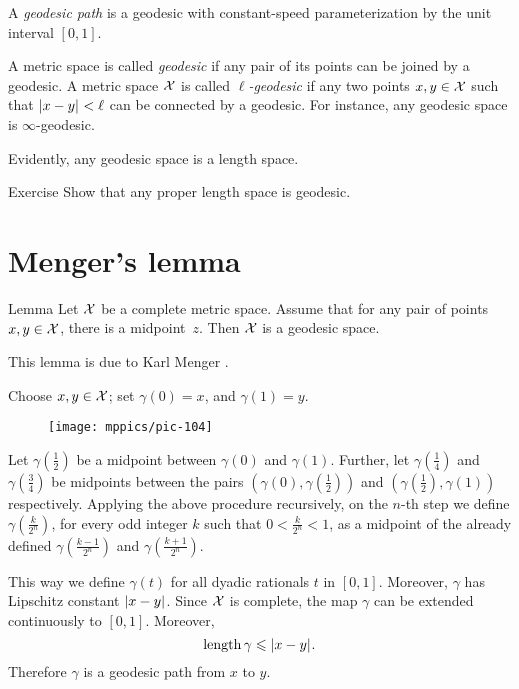 A \emph{geodesic path} is a geodesic with constant-speed parameterization by the unit interval $[0,1]$.

A metric space is called \emph{geodesic} if any pair of its points can be joined by a geodesic.
A metric space $\mathcal{X}$ is called {}\emph{$\ell$-geodesic}
if any two points $x,y\in\mathcal{X}$ such that $|{x}-{y}|_{}^{{}}<\ell$ can be connected by a geodesic.
For instance, any geodesic space is $\infty$-geodesic.

Evidently, any geodesic space is a length space.

\begin{thm}{Exercise}\label{ex:compact-length}
Show that any proper length space is geodesic.
\end{thm}

\section{Menger's lemma}

\begin{thm}{Lemma}\label{lem:mid>geod}
Let $\mathcal{X}$ be a complete metric space.
Assume that for any pair of points $x,y\in \mathcal{X}$, 
there is a midpoint~$z$.
Then $\mathcal{X}$ is a geodesic space.

\end{thm}

This lemma is due to Karl Menger \cite[Section 6]{menger}.


Choose $x,y\in \mathcal{X}$;
set $\gamma(0)=x$, and $\gamma(1)=y$.

\begin{figure}[ht!]
\vskip-0mm
\centering
\texttt{[image: mppics/pic-104]}
\end{figure}

Let $\gamma(\tfrac12)$ be a midpoint between $\gamma(0)$ and $\gamma(1)$.
Further, let $\gamma(\frac14)$ 
and $\gamma(\frac34)$ be midpoints between the pairs $(\gamma(0),\gamma(\tfrac12))$ 
and $(\gamma(\tfrac12),\gamma(1))$ respectively.
Applying the above procedure recursively,
on the $n$-th step we define $\gamma(\tfrac{k}{2^n})$,
for every odd integer $k$ such that $0<\tfrac k{2^n}<1$, 
as a midpoint of the already defined
$\gamma(\tfrac{k-1}{2^n})$ and $\gamma(\tfrac{k+1}{2^n})$.

This way we define $\gamma(t)$ for all dyadic rationals $t$ in $[0,1]$.
Moreover, $\gamma$ has Lipschitz constant $|{x}-{y}|_{}^{{}}$.
Since $\mathcal{X}$ is complete, the map $\gamma$ can be extended continuously to $[0,1]$.
Moreover,
\[
\mathop{\rm length}\nolimits\gamma\leqslant |{x}-{y}|_{}^{{}}.
\]
Therefore $\gamma$ is a geodesic path from $x$ to $y$.
\qedsf

